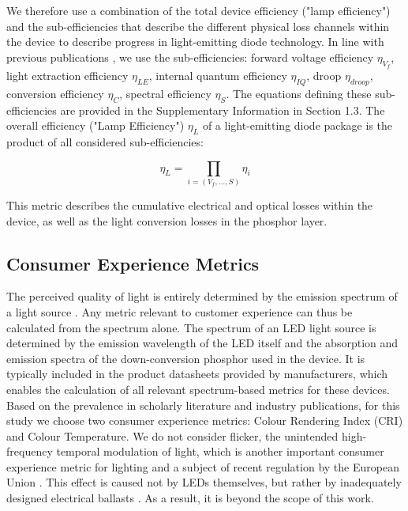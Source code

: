 \documentclass[journal=jacsat,manuscript=article]{achemso}
\begin{document}
We therefore use a combination of the total device efficiency ("lamp efficiency") and the sub-efficiencies that describe the different physical loss channels within the device to describe progress in light-emitting diode technology. In line with previous publications \cite{schubert2018light,tsao2010solid}, we use the sub-efficiencies: forward voltage efficiency $\eta_{V_f}$, light extraction efficiency $\eta_{LE}$, internal quantum efficiency $\eta_{IQ}$, droop $\eta_{droop}$, conversion efficiency $\eta_{C}$, spectral efficiency $\eta_{S}$. The equations defining these sub-efficiencies are provided in the Supplementary Information in Section 1.3. The overall efficiency ("Lamp Efficiency") $\eta_L$ of a light-emitting diode package is the product of all considered sub-efficiencies:

\begin{equation}
    \eta_L = \prod_{i=(V_f, \dots, S)} \eta_i
\end{equation}

This metric describes the cumulative electrical and optical losses within the device, as well as the light conversion losses in the phosphor layer.

\subsection{Consumer Experience Metrics}

The perceived quality of light is entirely determined by the emission spectrum of a light source \cite{ies_handbook}. Any metric relevant to customer experience can thus be calculated from the spectrum alone. The spectrum of an LED light source is determined by the emission wavelength of the LED itself and the absorption and emission spectra  of the down-conversion phosphor used in the device. It is typically included in the product datasheets provided by manufacturers, which enables the calculation of all relevant spectrum-based metrics for these devices. Based on the prevalence in scholarly literature and industry publications, for this study we choose two consumer experience metrics: Colour Rendering Index (CRI) and Colour Temperature. We do not consider flicker, the unintended high-frequency temporal modulation of light, which is another important consumer experience metric for lighting and a subject of recent regulation by the European Union \cite{weinold2020long}. This effect is caused not by LEDs themselves, but rather by inadequately designed electrical ballasts \cite{Lehman2014}. As a result, it is beyond the scope of this work. 
\end{document}
